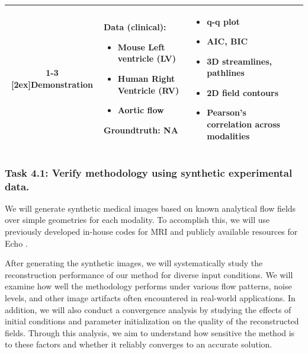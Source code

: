 \begin{table}[!h]
\begin{tabularx}{\textwidth}{c | X | X | X}
        \cmidrule{1-3}
        \multirow{8}{*}[2ex]{\centering Demonstration} & 
        \textbf{Data (clinical)}:
        \begin{itemize}[left=0em]
            \item Mouse Left ventricle (LV)
            \item Human Right Ventricle (RV)
            \item Aortic flow
        \end{itemize}
        \textbf{Groundtruth}: NA & 
        \begin{itemize}[left=0em]
            \item q-q plot
            \item AIC, BIC
            \item 3D streamlines, pathlines
            \item 2D field contours
            \item Pearson's correlation across modalities
        \end{itemize} & \\
        \bottomrule
    \end{tabularx}
\end{table}



\subsubsection*{Task 4.1: Verify methodology using synthetic experimental data.}
We will generate synthetic medical images based on known analytical flow fields over simple geometries for each modality. 
To accomplish this, we will use previously developed in-house codes for MRI \cite{zhang2021_4Dphaseunwrap,zhang2022_4Dsparserep} and publicly available resources for Echo \cite{jensen1992_echosyn, jensen1997_echosyn, sun2022_echodata}.

After generating the synthetic images, we will systematically study the reconstruction performance of our method for diverse input conditions. 
We will examine how well the methodology performs under various flow patterns, noise levels, and other image artifacts often encountered in real-world applications.
In addition, we will also conduct a convergence analysis by studying the effects of initial conditions and parameter initialization on the quality of the reconstructed fields. 
Through this analysis, we aim to understand how sensitive the method is to these factors and whether it reliably converges to an accurate solution.

